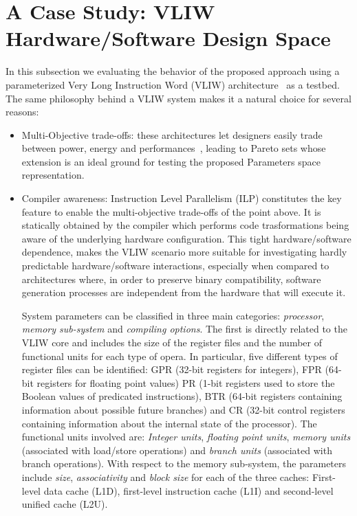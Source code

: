 \section{A Case Study: VLIW Hardware/Software Design Space}
\label{sec:ee}
In this subsection we evaluating the behavior of the proposed approach
using a parameterized Very Long Instruction
Word (VLIW) architecture~\cite{kathail_tr00} as a testbed. The same philosophy
behind a VLIW system makes it a natural choice for several reasons:
\begin{itemize}
\item{Multi-Objective trade-offs}: these architectures let designers
easily trade between power, energy and performances~\cite{}, leading
to Pareto sets whose extension is an ideal ground for testing the
proposed Parameters space representation.
\item{Compiler awareness}: Instruction Level Parallelism (ILP)
constitutes the key feature to enable the multi-objective trade-offs
of the point above. It is statically obtained by the compiler which
performs code trasformations being aware of the underlying hardware
configuration.  This tight hardware/software dependence, makes the
VLIW scenario more suitable for investigating hardly predictable
hardware/software interactions, especially when compared to
architectures where, in order to preserve binary compatibility,
software generation processes are independent from the hardware that
will execute it.

System parameters can be classified in three main categories:
\emph{processor}, \emph{memory sub-system} and \emph{compiling options}. 
The first is directly related to the VLIW core and includes the size
of the register files and the number of functional
units for each type of opera. In particular, five different types of register files can be identified:
GPR (32-bit registers for integers), FPR (64-bit registers for
floating point values) PR (1-bit registers used to store the Boolean
values of predicated instructions), BTR (64-bit registers containing
information about possible future branches) and CR (32-bit control
registers containing information about the internal state of the
processor). The functional units involved are: \emph{Integer units},
\emph{floating point units}, \emph{memory units} (associated with
load/store operations) and \emph{branch units} (associated with branch
operations). With respect to the memory sub-system, the parameters
include \emph{size}, \emph{associativity} and
\emph{block size} for each of the three caches: First-level data cache
(L1D), first-level instruction cache (L1I) and second-level unified
cache (L2U).


\end{itemize}
